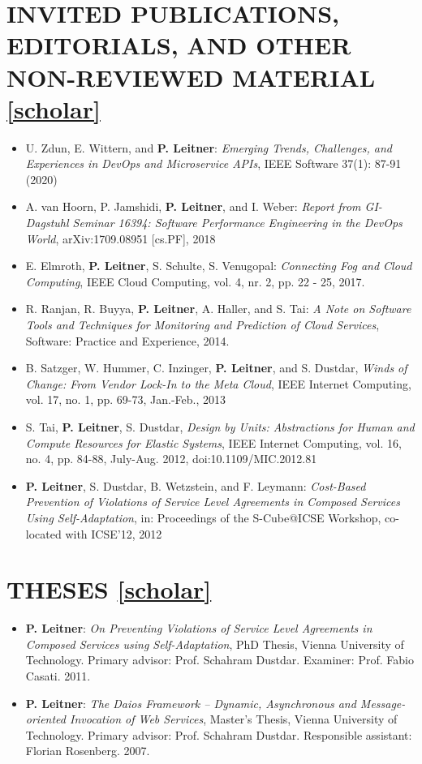 \documentclass[paper=letter,fontsize=11pt]{scrartcl} %
\newcommand{\NewPart}[2]{\section*{\uppercase{#1} #2}}
\begin{document}
\NewPart{Invited Publications, Editorials, and Other Non-Reviewed Material}{\href{https://scholar.google.ch/citations?user=wZ9f8CAAAAAJ}{[scholar]}}

\begin{itemize}
	\item  U. Zdun, E. Wittern, and \textbf{P. Leitner}: \emph{Emerging Trends, Challenges, and Experiences in DevOps and Microservice APIs}, IEEE Software 37(1): 87-91 (2020)
	\item A. van Hoorn, P. Jamshidi, \textbf{P. Leitner}, and I. Weber:
	\emph{Report from GI-Dagstuhl Seminar 16394: Software Performance Engineering in the DevOps World}, arXiv:1709.08951 [cs.PF], 2018
	\item E. Elmroth, \textbf{P. Leitner}, S. Schulte, S. Venugopal:
  \emph{Connecting Fog and Cloud Computing}, IEEE Cloud Computing, vol. 4, nr. 2, pp. 22 - 25, 2017.
  \item R. Ranjan, R. Buyya, \textbf{P. Leitner}, A. Haller, and S. Tai:
  \emph{A Note on Software Tools and Techniques for Monitoring and Prediction of Cloud Services}, Software: Practice and Experience, 2014.
  \item B. Satzger, W. Hummer, C. Inzinger, \textbf{P. Leitner}, and S. Dustdar, \emph{Winds of Change: From Vendor Lock-In to the Meta Cloud}, IEEE Internet Computing, vol. 17, no. 1, pp. 69-73, Jan.-Feb., 2013
  \item S. Tai, \textbf{P. Leitner}, S. Dustdar, \emph{Design by Units: Abstractions for Human and Compute Resources for Elastic Systems}, IEEE Internet Computing, vol. 16, no. 4, pp. 84-88, July-Aug. 2012, doi:10.1109/MIC.2012.81
  \item \textbf{P. Leitner}, S. Dustdar, B. Wetzstein, and F.
  Leymann: \emph{Cost-Based Prevention of Violations of Service Level Agreements
  in Composed Services Using Self-Adaptation}, in: Proceedings of the S-Cube@ICSE Workshop, co-located with ICSE'12, 2012
\end{itemize}

\NewPart{Theses}{\href{https://scholar.google.ch/citations?user=wZ9f8CAAAAAJ}{[scholar]}}

\begin{itemize}
  \item \textbf{P. Leitner}: \emph{On Preventing Violations of Service Level
  Agreements in Composed Services using Self-Adaptation},  PhD Thesis, Vienna
  University of Technology. Primary advisor: Prof. Schahram Dustdar. Examiner:
  Prof. Fabio Casati. 2011.
  \item \textbf{P. Leitner}: \emph{The Daios Framework -- Dynamic, Asynchronous
  and Message-oriented Invocation of Web Services},  Master's Thesis, Vienna
  University of Technology. Primary advisor: Prof. Schahram Dustdar. Responsible
  assistant: Florian Rosenberg. 2007.
\end{itemize}
\end{document}
